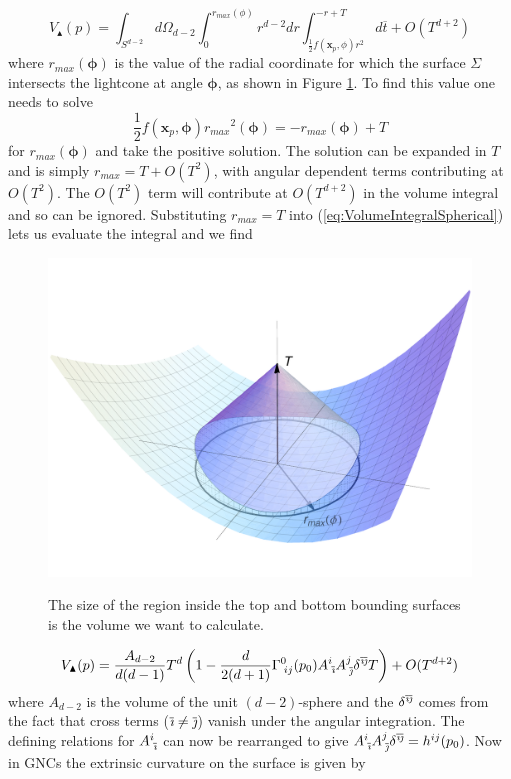 \documentclass[12pt]{article}
\newcommand{\be}{\begin{equation}}
\newcommand{\ee}{\end{equation}}
\newcommand{\ibar}{{\overline{\emph\i}}}
\newcommand{\jbar}{{\overline{\emph\j}}}
\begin{document}
\be\label{eq:VolumeIntegralSpherical}
V_\blacktriangle(p)=\int_{S^{d-2}}
d\Omega_{d-2}
\int_{0}^{r_{max}(\phi)}r^{d-2}dr
\int_{\frac{1}{2}f(\mathbf{x}_p,\phi)r^2}^{-r+T}
d\overline{t}+O(T^{d+2})
\ee
where $r_{max}(\boldsymbol\phi)$ is the value of the radial coordinate for which the surface $\Sigma$ intersects the lightcone at angle $\boldsymbol\phi$, as shown in Figure \ref{fig:cone_plot}. To find this value one needs to solve 
\be
\frac{1}{2}f(\mathbf{x}_p,\boldsymbol\phi){r_{max}}^2(\boldsymbol\phi)=-r_{max}(\boldsymbol\phi)+T
\ee 
for $r_{max}(\boldsymbol\phi)$ and take the positive solution. The solution can be expanded in $T$ and is simply $r_{max}=T+O(T^2)$, with angular dependent terms contributing at $O(T^2)$. The $O(T^2)$ term will contribute at $O(T^{d+2})$ in the volume integral and so can be ignored. Substituting $r_{max}=T$ into (\ref{eq:VolumeIntegralSpherical}) lets us evaluate the integral and we find 
\begin{figure}[t]
  \centering
    {\includegraphics[scale=0.5]{coneplot}}
     \caption{The size of the region inside the top and bottom bounding surfaces is the volume we want to calculate.}
     \label{fig:cone_plot}
\end{figure}
\be\label{eq:VolumeNoK}
V_\blacktriangle(p)
=\frac{A_{d-2}}{d(d-1)}T^d\left(1-\frac{d}{2(d+1)}\Gamma^{0}_{\;ij}(p_0)A^{i}_{\;\ibar}A^{j}_{\;\jbar}\delta^{\ibar\jbar}T\right)
+O(T^{d+2})
\ee
where $A_{d-2}$ is the volume of the unit $(d-2)$-sphere and the $\delta^{\ibar\jbar}$ comes from the fact that cross terms ($\ibar\neq \jbar$) vanish under the angular integration. The defining relations for $A^{i}_{\;\ibar}$ can now be rearranged to give $A^{i}_{\;\ibar}A^{j}_{\;\jbar}\delta^{\ibar\jbar}=h^{ij}(p_0)$. Now in GNCs the extrinsic curvature on the surface is given by
\end{document}
